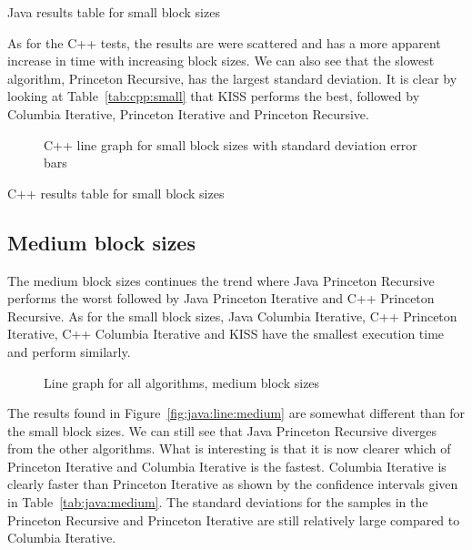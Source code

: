 \begin{table}
    \centering
    \caption{Java results table for small block sizes}
    \label{tab:java:small}
    
\end{table}

As for the C++ tests, the results are were scattered and has a more apparent increase in time with increasing block sizes. We can also see that the slowest algorithm, Princeton Recursive, has the largest standard deviation. It is clear by looking at Table~\ref{tab:cpp:small} that KISS performs the best, followed by Columbia Iterative, Princeton Iterative and Princeton Recursive.

\begin{figure}
    \centering
    
    \caption{C++ line graph for small block sizes with standard deviation error bars}
    \label{fig:cpp:line:small}
\end{figure}

\begin{table}
    \centering
    \caption{C++ results table for small block sizes}
    \label{tab:cpp:small}
    \resizebox{\columnwidth}{!}{
        
    }
\end{table}


\subsection{Medium block sizes}
The medium block sizes continues the trend where Java Princeton Recursive performs the worst followed by Java Princeton Iterative and C++ Princeton Recursive. As for the small block sizes, Java Columbia Iterative, C++ Princeton Iterative, C++ Columbia Iterative and KISS have the smallest execution time and perform similarly.

\begin{figure}[H]
    \centering
    
    \caption{Line graph for all algorithms, medium block sizes}
    \label{fig:all:line:medium}
\end{figure}

The results found in Figure~\ref{fig:java:line:medium} are somewhat different than for the small block sizes. We can still see that Java Princeton Recursive diverges from the other algorithms. What is interesting is that it is now clearer which of Princeton Iterative and Columbia Iterative is the fastest. Columbia Iterative is clearly faster than Princeton Iterative as shown by the confidence intervals given in Table~\ref{tab:java:medium}. The standard deviations for the samples in the Princeton Recursive and Princeton Iterative are still relatively large compared to Columbia Iterative.

